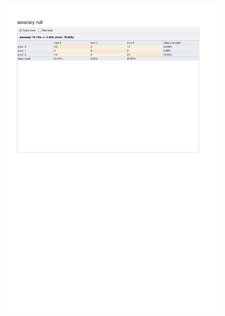 \begin{figure}[htp]
  \centerline{\includegraphics[trim=0 680 0 80,clip,width=16.09cm]{results/ANN_A_Boredom.pdf}} \caption{
} \label{ANN_A_Boredom}
\end{figure}

